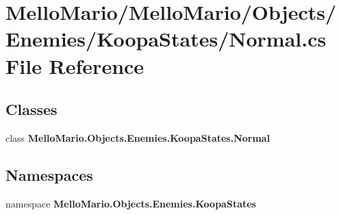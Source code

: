 \section{Mello\+Mario/\+Mello\+Mario/\+Objects/\+Enemies/\+Koopa\+States/\+Normal.cs File Reference}
\label{Enemies_2KoopaStates_2Normal_8cs}
\subsection*{Classes}
\begin{DoxyCompactItemize}
\item 
class \textbf{ Mello\+Mario.\+Objects.\+Enemies.\+Koopa\+States.\+Normal}
\end{DoxyCompactItemize}
\subsection*{Namespaces}
\begin{DoxyCompactItemize}
\item 
namespace \textbf{ Mello\+Mario.\+Objects.\+Enemies.\+Koopa\+States}
\end{DoxyCompactItemize}
